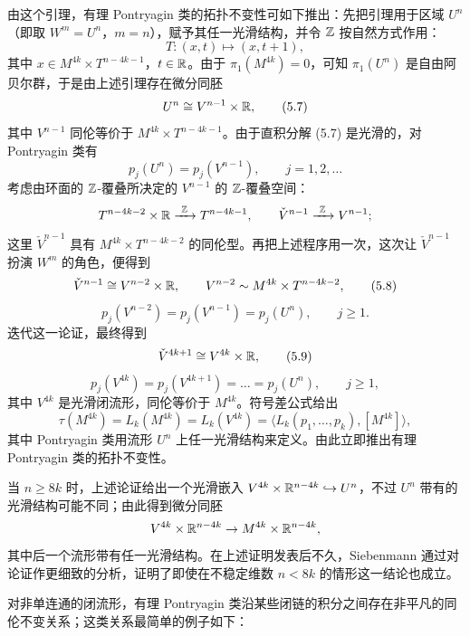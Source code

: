 由这个引理，有理 Pontryagin 类的拓扑不变性可如下推出：先把引理用于区域 $U^{n}$（即取 $W^{m}=U^{n}$，$m=n$），赋予其任一光滑结构，并令 $\mathbb{Z}$ 按自然方式作用：
\[
T\colon(x,t)\mapsto(x,t+1),
\]
其中 $x\in M^{4k}\times T^{n-4k-1}$，$t\in\mathbb{R}$。由于 $\pi_{1}(M^{4k})=0$，可知 $\pi_{1}(U^{n})$ 是自由阿贝尔群，于是由上述引理存在微分同胚
\begin{equation}
U^{n}\cong V^{n-1}\times\mathbb{R}, \tag{5.7}
\end{equation}
其中 $V^{n-1}$ 同伦等价于 $M^{4k}\times T^{n-4k-1}$。由于直积分解 (5.7) 是光滑的，对 Pontryagin 类有
\[
p_{j}(U^{n})=p_{j}(V^{n-1}),\qquad j=1,2,\dots
\]
考虑由环面的 $\mathbb{Z}$-覆叠所决定的 $V^{n-1}$ 的 $\mathbb{Z}$-覆叠空间：
\[
T^{n-4k-2}\times\R\xrightarrow{\ \Z\ }T^{n-4k-1},\qquad
\check V^{n-1}\xrightarrow{\ \Z\ }V^{n-1};
\]
这里 $\check V^{n-1}$ 具有 $M^{4k}\times T^{n-4k-2}$ 的同伦型。再把上述程序用一次，这次让 $\check V^{n-1}$ 扮演 $W^{m}$ 的角色，便得到
\begin{equation}
\check V^{n-1}\cong V^{n-2}\times\mathbb{R},\qquad V^{n-2}\sim M^{4k}\times T^{n-4k-2}, \tag{5.8}
\end{equation}
\[
p_{j}(V^{n-2})=p_{j}(V^{n-1})=p_{j}(U^{n}),\qquad j\ge 1.
\]
迭代这一论证，最终得到
\begin{equation}
\check V^{4k+1}\cong V^{4k}\times\mathbb{R}, \tag{5.9}
\end{equation}
\[
p_{j}(V^{4k})=p_{j}(V^{4k+1})=\dots=p_{j}(U^{n}),\qquad j\ge 1,
\]
其中 $V^{4k}$ 是光滑闭流形，同伦等价于 $M^{4k}$。符号差公式给出
\[
\tau(M^{4k})=L_{k}(M^{4k})=L_{k}(V^{4k})=\langle L_{k}(p_{1},\dots,p_{k}),[M^{4k}]\rangle,
\]
其中 Pontryagin 类用流形 $U^{n}$ 上任一光滑结构来定义。由此立即推出有理 Pontryagin 类的拓扑不变性。

当 $n\ge 8k$ 时，上述论证给出一个光滑嵌入 $V^{4k}\times\mathbb{R}^{n-4k}\hookrightarrow U^{n}$，不过 $U^{n}$ 带有的光滑结构可能不同；由此得到微分同胚
\[
V^{4k}\times\mathbb{R}^{n-4k}\to M^{4k}\times\mathbb{R}^{n-4k},
\]
其中后一个流形带有任一光滑结构。在上述证明发表后不久，Siebenmann 通过对论证作更细致的分析，证明了即使在不稳定维数 $n<8k$ 的情形这一结论也成立。

对非单连通的闭流形，有理 Pontryagin 类沿某些闭链的积分之间存在非平凡的同伦不变关系；这类关系最简单的例子如下：

